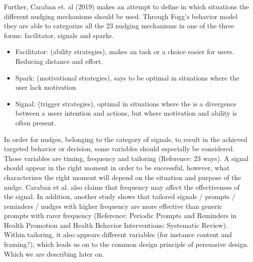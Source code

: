 Further, Caraban et. al (2019) makes an attempt to define in which situations the different nudging mechanisms should be used. Through Fogg's behavior model they are able to categorize all the 23 nudging mechanisms in one of the three forms: facilitator, signals and sparks.
\begin{itemize}
\item Facilitator: (ability strategies), makes an task or a choice easier for users. Reducing distance and effort. 
\item Spark: (motivational strategies), says to be optimal in situations where the user lack motivation 
\item Signal: (trigger strategies), optimal in situations where the is a divergence between a users intention and actions, but where motivation and ability is often present. 
\end{itemize}

In order for nudges, belonging to the category of signals, to result in the achieved targeted  behavior or decision, some variables should especially be considered. Those variables are timing, frequency and tailoring (Reference: 23 ways). A signal should appear in the right moment in order to be successful, however, what characterizes the right moment will depend on the situation and purpose of the nudge. Caraban et al. also claims that frequency may affect the effectiveness of the signal. In addition, another study shows that tailored signals / prompts / reminders / nudges with higher frequency are more effective than generic prompts with rarer frequency (Reference: Periodic Prompts and Reminders in Health Promotion and Health Behavior Interventions: Systematic Review). Within tailoring, it also appears different variables (for instance content and framing?), which leads us on to the common design principle of persuasive design. Which we are describing later on.  

